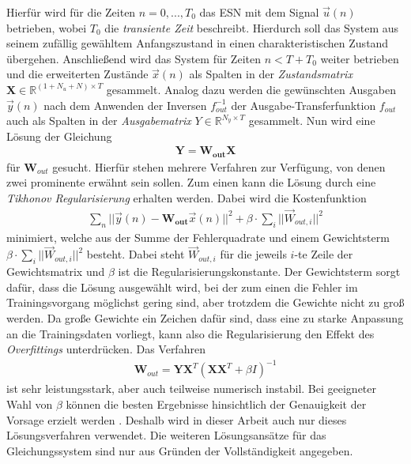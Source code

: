 Hierfür wird für die Zeiten $n=0, ..., T_0$ das \textsc{ESN} mit dem Signal $\vec{u}(n)$ betrieben, wobei $T_0$ die \textit{transiente Zeit} beschreibt. Hierdurch soll das System aus seinem zufällig gewähltem Anfangszustand in einen charakteristischen Zustand übergehen. Anschließend wird das System für Zeiten $n < T + T_0$ weiter betrieben und die erweiterten Zustände $\vec{x}(n)$ als Spalten in der \textit{Zustandsmatrix} $\mathbf{X} \in \mathbb{R}^{(1 + N_u + N) \times T}$ gesammelt. Analog dazu werden die gewünschten Ausgaben $\vec{y}(n)$ nach dem Anwenden der Inversen $f^{-1}_{out}$ der Ausgabe-Transferfunktion $f_{out}$ auch als Spalten in der \textit{Ausgabematrix} $Y \in \mathbb{R}^{N_y \times T}$ gesammelt.
Nun wird eine Lösung der Gleichung
\begin{align}
\mathbf{Y} = \mathbf{W_{out}} \mathbf{X}
\end{align}
für $\mathbf{W}_{out}$ gesucht. Hierfür stehen mehrere Verfahren zur Verfügung, von denen zwei prominente erwähnt sein sollen.
Zum einen kann die Lösung durch eine \textit{Tikhonov Regularisierung} erhalten werden. Dabei wird die Kostenfunktion 
\begin{align}
\sum_n ||\vec{y}(n) - \mathbf{W_{out}}\vec{x}(n)||^2 + \beta \cdot \sum_i ||\vec{W}_{out, i}||^2
\end{align}
minimiert, welche aus der Summe der Fehlerquadrate und einem Gewichtsterm $\beta \cdot \sum_i ||\vec{W}_{out, i}||^2$ besteht. Dabei steht $\vec{W}_{out, i}$ für die jeweils $i$-te Zeile der Gewichtsmatrix und $\beta$ ist die Regularisierungskonstante. Der Gewichtsterm sorgt dafür, dass die Lösung ausgewählt wird, bei der zum einen die Fehler im Trainingsvorgang möglichst gering sind, aber trotzdem die Gewichte nicht zu groß werden. Da große Gewichte ein Zeichen dafür sind, dass eine zu starke Anpassung an die Trainingsdaten vorliegt, kann also die Regularisierung den Effekt des \textit{Overfittings} unterdrücken. Das Verfahren
\begin{align}
\label{eq:tikhonov}
\mathbf{W}_{out} = \mathbf{Y} \mathbf{X}^T \left(\mathbf{X} \mathbf{X}^T + \beta I \right)^{-1}
\end{align}
ist sehr leistungsstark, aber auch teilweise numerisch instabil. Bei geeigneter Wahl von $\beta$ können die besten Ergebnisse hinsichtlich der Genauigkeit der Vorsage erzielt werden \cite{lukoseviciusa2009}. Deshalb wird in dieser Arbeit auch nur dieses Lösungsverfahren verwendet. Die weiteren Lösungsansätze für das Gleichungssystem sind nur aus Gründen der Vollständigkeit angegeben.\\

